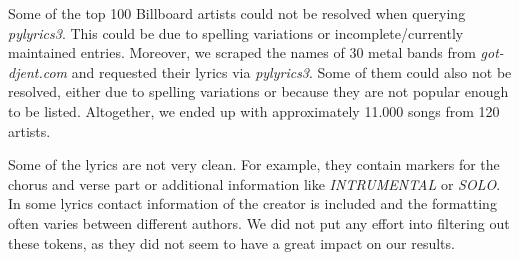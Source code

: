 \documentclass[10pt,a4paper]{article}
\begin{document}
	Some of the top 100 Billboard artists could not be resolved when querying \textit{pylyrics3}. This could be due to spelling variations or incomplete/currently maintained entries. Moreover, we scraped the names of 30 metal bands from \textit{got-djent.com} and requested their lyrics via \textit{pylyrics3}. Some of them could also not be resolved, either due to spelling variations or because they are not popular enough to be listed. Altogether, we ended up with approximately 11.000 songs from 120 artists.

	
	Some of the lyrics are not very clean. For example, they contain markers for the chorus and verse part or additional information like \textit{INTRUMENTAL} or \textit{SOLO}. In some lyrics contact information of the creator is included and the formatting often varies between different authors. We did not put any effort into filtering out these tokens, as they did not seem to have a great impact on our results.
	

\end{document}
